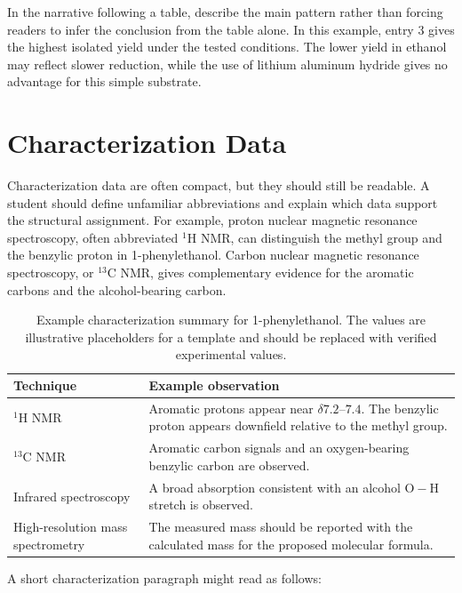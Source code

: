 In the narrative following a table, describe the main pattern rather than forcing readers to infer the conclusion from the table alone. In this example, entry 3 gives the highest isolated yield under the tested conditions. The lower yield in ethanol may reflect slower reduction, while the use of lithium aluminum hydride gives no advantage for this simple substrate.

\section{Characterization Data}
\label{sec:characterization-data}

Characterization data are often compact, but they should still be readable. A student should define unfamiliar abbreviations and explain which data support the structural assignment. For example, proton nuclear magnetic resonance spectroscopy, often abbreviated \({}^{1}\mathrm{H}\) NMR, can distinguish the methyl group and the benzylic proton in 1-phenylethanol. Carbon nuclear magnetic resonance spectroscopy, or \({}^{13}\mathrm{C}\) NMR, gives complementary evidence for the aromatic carbons and the alcohol-bearing carbon.

\begin{table}[htbp]
\centering
\caption{Example characterization summary for 1-phenylethanol. The values are illustrative placeholders for a template and should be replaced with verified experimental values.}
\label{tab:characterization-summary}
\begin{tabular}{p{}p{}}
\toprule
\textbf{Technique} & \textbf{Example observation} \\
\midrule
\({}^{1}\mathrm{H}\) NMR & Aromatic protons appear near \(\delta 7.2\)--\(7.4\). The benzylic proton appears downfield relative to the methyl group. \\
\({}^{13}\mathrm{C}\) NMR & Aromatic carbon signals and an oxygen-bearing benzylic carbon are observed. \\
Infrared spectroscopy & A broad absorption consistent with an alcohol \(\mathrm{O-H}\) stretch is observed. \\
High-resolution mass spectrometry & The measured mass should be reported with the calculated mass for the proposed molecular formula. \\
\bottomrule
\end{tabular}
\end{table}

A short characterization paragraph might read as follows:

